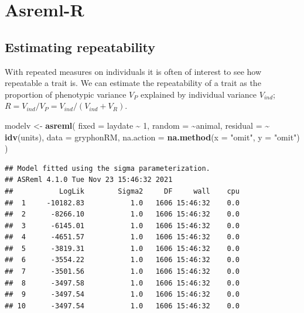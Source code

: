 \documentclass[
  12pt,
]{book}
\newenvironment{Shaded}{\begin{snugshade}}{\end{snugshade}}
\newcommand{\DataTypeTok}[1]{\textcolor[rgb]{0.13,0.29,0.53}{#1}}
\newcommand{\DecValTok}[1]{\textcolor[rgb]{0.00,0.00,0.81}{#1}}
\newcommand{\KeywordTok}[1]{\textcolor[rgb]{0.13,0.29,0.53}{\textbf{#1}}}
\newcommand{\NormalTok}[1]{#1}
\newcommand{\OperatorTok}[1]{\textcolor[rgb]{0.81,0.36,0.00}{\textbf{#1}}}
\newcommand{\StringTok}[1]{\textcolor[rgb]{0.31,0.60,0.02}{#1}}
\begin{document}
\hypertarget{asreml-r-2}{%
\section{Asreml-R}\label{asreml-r-2}}

\hypertarget{estimating-repeatability}{%
\subsection{Estimating repeatability}\label{estimating-repeatability}}

With repeated measures on individuals it is often of interest to see how repeatable a trait is.
We can estimate the repeatability of a trait as the proportion of phenotypic variance \(V_P\) explained by individual variance \(V_{ind}\); \(R = V_{ind}/V_P = V_{ind}/(V_{ind}+V_R)\).

\begin{Shaded}
\begin{Highlighting}[]
\NormalTok{modelv \textless{}{-}}\StringTok{ }\KeywordTok{asreml}\NormalTok{(}
  \DataTypeTok{fixed =}\NormalTok{ laydate }\OperatorTok{\textasciitilde{}}\StringTok{ }\DecValTok{1}\NormalTok{,}
  \DataTypeTok{random =} \OperatorTok{\textasciitilde{}}\NormalTok{animal,}
  \DataTypeTok{residual =} \OperatorTok{\textasciitilde{}}\StringTok{ }\KeywordTok{idv}\NormalTok{(units),}
  \DataTypeTok{data =}\NormalTok{ gryphonRM,}
  \DataTypeTok{na.action =} \KeywordTok{na.method}\NormalTok{(}\DataTypeTok{x =} \StringTok{"omit"}\NormalTok{, }\DataTypeTok{y =} \StringTok{"omit"}\NormalTok{)}
\NormalTok{)}
\end{Highlighting}
\end{Shaded}

\begin{verbatim}
## Model fitted using the sigma parameterization.
## ASReml 4.1.0 Tue Nov 23 15:46:32 2021
##           LogLik        Sigma2     DF     wall    cpu
##  1     -10182.83           1.0   1606 15:46:32    0.0
##  2      -8266.10           1.0   1606 15:46:32    0.0
##  3      -6145.01           1.0   1606 15:46:32    0.0
##  4      -4651.57           1.0   1606 15:46:32    0.0
##  5      -3819.31           1.0   1606 15:46:32    0.0
##  6      -3554.22           1.0   1606 15:46:32    0.0
##  7      -3501.56           1.0   1606 15:46:32    0.0
##  8      -3497.58           1.0   1606 15:46:32    0.0
##  9      -3497.54           1.0   1606 15:46:32    0.0
## 10      -3497.54           1.0   1606 15:46:32    0.0
\end{verbatim}
\end{document}
